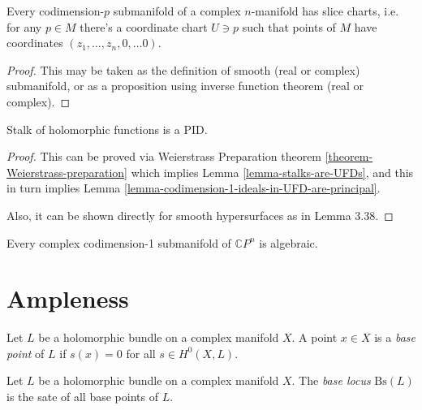 \begin{proposition}
\label{proposition-slice-charts}
Every codimension-$p$ submanifold of a complex $n$-manifold has slice charts,
i.e. for any $p \in M$ there's a coordinate chart $U \ni p$ such that points of
$M$ have coordinates $(z_1,\ldots,z_n,0,\ldots 0)$.
\end{proposition}

\begin{proof}
This may be taken as the definition of smooth (real or complex) submanifold, or
as a proposition using inverse function theorem (real or complex).
\end{proof}

\begin{proposition}
\label{proposition-stalk-is-PID}
Stalk of holomorphic functions is a PID.
\end{proposition}

\begin{proof}
This can be proved via Weierstrass Preparation theorem
\ref{theorem-Weierstrass-preparation} which implies
 Lemma \ref{lemma-stalks-are-UFDs}, and this in turn implies Lemma 
\ref{lemma-codimension-1-ideals-in-UFD-are-principal}.

Also, it can be shown directly for smooth hypersurfaces
 as in \cite{lec} Lemma 3.38.
\end{proof}

\begin{theorem}
\label{theorem-Chow-for-hypersurfaces}
Every complex codimension-1 submanifold of $\mathbb{C}P^{n}$ is algebraic.
\end{theorem}

\section{Ampleness}
\label{section-ampleness}

\begin{definition}
\label{definition-base-point}
\begin{reference}
\cite[Definition 2.3.25]{huc}
\end{reference}
Let $L$ be a holomorphic bundle on a complex manifold $X$. A point $x \in X$ is
a {\it base point} of $L$ if $s(x)=0$ for all $s\in H^{0}(X,L)$. 
\end{definition}

\begin{definition}
\label{definition-base-locus}
\begin{reference}
\cite[Definition 2.3.25]{huc}
\end{reference}
Let $L$ be a holomorphic bundle on a complex manifold $X$. 
The {\it base locus} $\text{Bs}(L)$ is the sate of all base points of $L$.
\end{definition}

